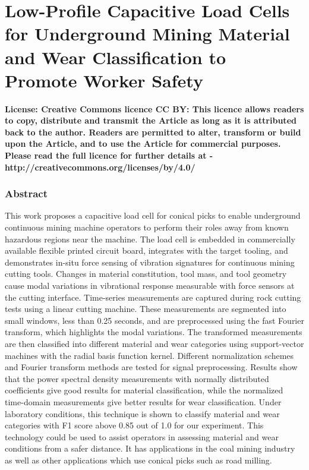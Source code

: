 \chapter[
Capacitive Load Cells to 
 Promote Worker Safety
]{
Low-Profile Capacitive Load Cells for 
 Underground Mining Material and Wear Classification
 to Promote Worker Safety
\label{chap:P1}
}

\newcommand{\ora}{\overrightarrow}

\begin{center}
\bfseries{License:} Creative Commons licence CC BY: This licence allows readers to copy, distribute and transmit the Article as
long as it is attributed back to the author. Readers are permitted to alter, transform or build upon the Article,
and to use the Article for commercial purposes. Please read the full licence for further details at -
http://creativecommons.org/licenses/by/4.0/
\end{center}

\subsection{Abstract}

This work proposes a capacitive load cell for conical picks to enable 
 underground continuous mining machine operators to 
 perform their roles away from known hazardous regions near the machine.
The load cell is embedded in commercially available flexible printed circuit board,
 integrates with the target tooling, and demonstrates in-situ force sensing 
 of vibration signatures for continuous mining cutting tools.
Changes in material constitution, tool mass, and tool geometry cause modal variations
 in vibrational response measurable with force sensors at the cutting interface.
Time-series measurements are captured during rock cutting tests using a linear cutting machine.
These measurements are segmented into small windows, less than 0.25 seconds, and are preprocessed 
 using the fast Fourier transform, which highlights the modal variations.
The transformed measurements are then classified into different material and wear categories
 using support-vector machines with the radial basis function kernel.
Different normalization schemes and Fourier transform methods are tested for signal preprocessing.
Results show that the power spectral density measurements with normally distributed coefficients 
 give good results for material classification, while the normalized time-domain measurements
 give better results for wear classification.
Under laboratory conditions, this technique is shown to 
 classify material and wear categories with F1 score above 0.85 out of 1.0 for our experiment.
This technology could be used to assist operators in assessing material and wear conditions from
 a safer distance. 
It has applications in the coal mining industry as well as other applications
which use conical picks such as road milling.

